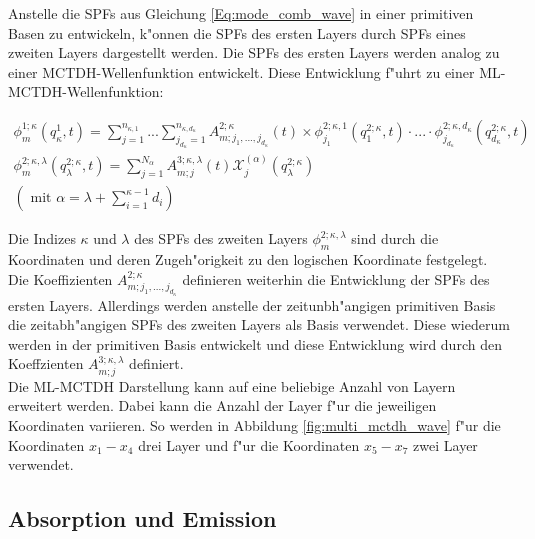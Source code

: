 Anstelle die SPFs aus Gleichung \ref{Eq:mode_comb_wave} in einer primitiven Basen zu entwickeln, k"onnen die SPFs des ersten Layers
durch SPFs eines zweiten Layers dargestellt werden. Die SPFs des ersten Layers werden analog zu einer MCTDH-Wellenfunktion entwickelt.
Diese Entwicklung f"uhrt zu einer ML-MCTDH-Wellenfunktion:

\begin{equation}
  \begin{gathered}
 \phi^{1;\kappa}_{m} (q^1_{\kappa}, t)=\sum^{n_{\kappa,1}}_{j=1} ... \sum^{n_{\kappa,d_\kappa}}_{j_{d_\kappa}=1} A^{2;\kappa}_{m;j_1,...,j_{d_\kappa}}(t)
 \times \phi^{2;\kappa,1}_{j_1} (q^{2;\kappa}_{1}, t) \cdot ... \cdot
 \phi^{2;\kappa,d_\kappa}_{j_{d_\kappa}} (q^{2;\kappa}_{d_\kappa}, t)
\\
 \phi^{2;\kappa, \lambda}_{m} (q^{2;\kappa}_{\lambda}, t)= \sum^{N_{\alpha}}_{j=1} A^{3;\kappa, \lambda}_{m;j}(t)
 \mathcal{X}^{(\alpha)}_{j}(q^{2;\kappa}_\lambda)
\\
 \left( \text{ mit } \alpha = \lambda + \sum^{\kappa - 1}_{i=1}d_i \right)
 \label{Eq:ml_mctdh_mode_SPF}
\end{gathered}
 \end{equation}

Die Indizes $\kappa$ und $\lambda$ des SPFs des zweiten Layers $ \phi^{2;\kappa, \lambda}_{m}  $  sind durch die Koordinaten und deren
Zugeh"origkeit zu den logischen Koordinate festgelegt.
Die Koeffizienten $A^{2;\kappa}_{m;j_1,...,j_{d_\kappa}}$ definieren weiterhin die Entwicklung der SPFs des ersten Layers.
Allerdings werden anstelle der zeitunbh"angigen primitiven Basis die zeitabh"angigen SPFs des zweiten Layers als Basis verwendet.
Diese wiederum werden in der primitiven Basis entwickelt und diese Entwicklung wird durch den Koeffzienten  $A^{3;\kappa, \lambda}_{m;j}$
definiert.
  \\Die ML-MCTDH Darstellung kann auf eine beliebige Anzahl von Layern erweitert werden.
  Dabei kann die Anzahl der Layer f"ur die jeweiligen Koordinaten variieren. So werden in Abbildung \ref{fig:multi_mctdh_wave} f"ur die Koordinaten $x_1-x_4$ drei Layer
  und f"ur die Koordinaten $x_5 - x_7$ zwei Layer verwendet.









\clearpage
 \subsection{Absorption und Emission}
